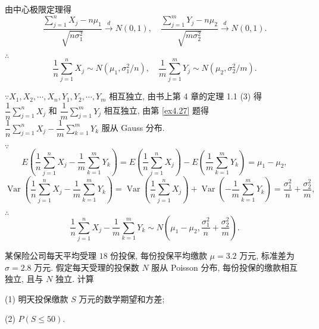 \documentclass[color=black,device=normal,lang=cn]{elegantnote}
\numberwithin{equation}{section}
\theoremstyle{plain}
\numberwithin{exercise}{exsection}
\begin{document}
\begin{solution}
    由中心极限定理得
    \[\dfrac{\sum\limits_{j=1}^nX_j-n\mu_1}{\sqrt{n\sigma_1^2}}\xrightarrow{d}N(0,1),\quad\dfrac{\sum\limits_{j=1}^mY_j-n\mu_2}{\sqrt{m\sigma_2^2}}\xrightarrow{d}N(0,1).\]

    $\therefore$
    \[\dfrac{1}{n}\sum\limits_{j=1}^nX_j\sim N(\mu_1,\sigma^2_1/n),\quad\dfrac{1}{m}\sum\limits_{j=1}^mY_j\sim N(\mu_2,\sigma_2^2/m).\]

    $\because X_1,X_2,\cdots,X_n,Y_1,Y_2,\cdots,Y_m$ 相互独立, 由书上第 4 章的定理 1.1 (3) 得 $\dfrac{1}{n}\sum\limits_{j=1}^nX_j$ 和 $\dfrac{1}{m}\sum\limits_{j=1}^mY_j$ 相互独立, 由第 \ref{ex4.27} 题得 $\dfrac{1}{n}\sum\limits_{j=1}^nX_j-\dfrac{1}{m}\sum\limits_{k=1}^mY_k$ 服从 Gauss 分布.

    $\because$
    \[E\left(\dfrac{1}{n}\sum\limits_{j=1}^nX_j-\dfrac{1}{m}\sum\limits_{k=1}^mY_k\right)=E\left(\dfrac{1}{n}\sum\limits_{j=1}^nX_j\right)-E\left(\dfrac{1}{m}\sum\limits_{k=1}^mY_k\right)=\mu_1-\mu_2,\]
    \[\operatorname{Var}\left(\dfrac{1}{n}\sum\limits_{j=1}^nX_j-\dfrac{1}{m}\sum\limits_{k=1}^mY_k\right)=\operatorname{Var}\left(\dfrac{1}{n}\sum\limits_{j=1}^nX_j\right)+\operatorname{Var}\left(-\dfrac{1}{m}\sum\limits_{k=1}^mY_k\right)=\dfrac{\sigma_1^2}{n}+\dfrac{\sigma_2^2}{m},\]

    $\therefore$
    \[\dfrac{1}{n}\sum\limits_{j=1}^nX_j-\dfrac{1}{m}\sum\limits_{k=1}^mY_k\sim N\left(\mu_1-\mu_2,\dfrac{\sigma_1^2}{n}+\dfrac{\sigma_2^2}{m}\right).\]
\end{solution}
\begin{exercise}%
    某保险公司每天平均受理 $18$ 份投保, 每份投保平均缴款 $\mu=3.2$ 万元, 标准差为 $\sigma=2.8$ 万元. 假定每天受理的投保数 $N$ 服从 Poisson 分布, 每份投保的缴款相互独立, 且与 $N$ 独立. 计算

    (1) 明天投保缴款 $S$ 万元的数学期望和方差;

    (2) $P(S\leq50)$.
\end{exercise}
\end{document}
